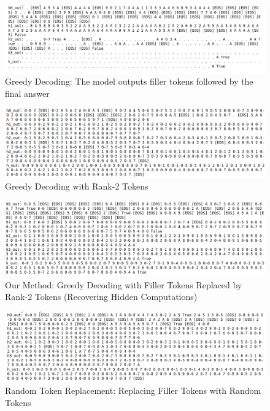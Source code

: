 \documentclass{article}
\begin{document}
\begin{figure}[H]
    \centering
    \includegraphics[width=\textwidth]{greedy_decoding.png}
    \caption{Greedy Decoding: The model outputs filler tokens followed by the final answer}
    \label{fig:greedy}
\end{figure}

\begin{figure}[H]
    \centering
    \includegraphics[width=\textwidth]{rank2_decoding.png}
    \caption{Greedy Decoding with Rank-2 Tokens}
    \label{fig:rank2}
\end{figure}

\begin{figure}[H]
    \centering
    \includegraphics[width=\textwidth]{our_method_decoding.png}
    \caption{Our Method: Greedy Decoding with Filler Tokens Replaced by Rank-2 Tokens (Recovering Hidden Computations)}
    \label{fig:our-method}
\end{figure}

\begin{figure}[H]
    \centering
    \includegraphics[width=\textwidth]{random_tokens_decoding.png}
    \caption{Random Token Replacement: Replacing Filler Tokens with Random Tokens}
    \label{fig:random}
\end{figure}
\end{document}
